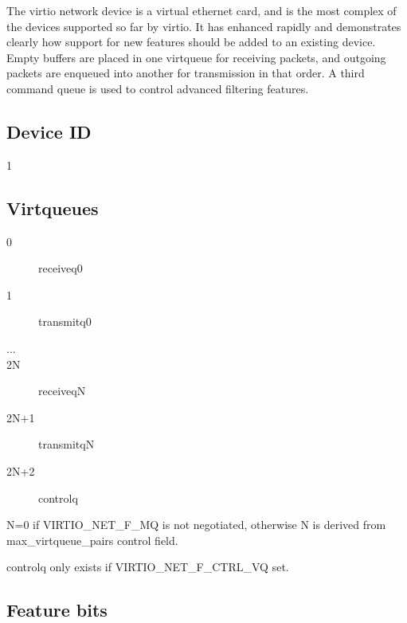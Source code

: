 The virtio network device is a virtual ethernet card, and is the
most complex of the devices supported so far by virtio. It has
enhanced rapidly and demonstrates clearly how support for new
features should be added to an existing device. Empty buffers are
placed in one virtqueue for receiving packets, and outgoing
packets are enqueued into another for transmission in that order.
A third command queue is used to control advanced filtering
features.

\subsection{Device ID}\label{sec:Device Types / Network Device / Device ID}

 1

\subsection{Virtqueues}\label{sec:Device Types / Network Device / Virtqueues}

\begin{description}
\item[0] receiveq0
\item[1] transmitq0
\item[...]
\item[2N] receiveqN
\item[2N+1] transmitqN
\item[2N+2] controlq
\end{description}

 N=0 if VIRTIO_NET_F_MQ is not negotiated, otherwise N is derived
 from max_virtqueue_pairs control field.

 controlq only exists if VIRTIO_NET_F_CTRL_VQ set.

\subsection{Feature bits}\label{sec:Device Types / Network Device / Feature bits}

